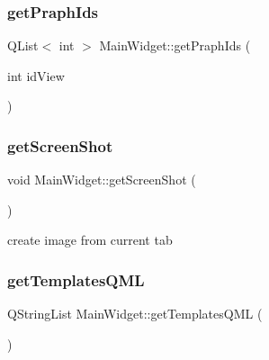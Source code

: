 \hypertarget{class_main_widget_ab020265c95f21766b1aa1f8c426e7f34}{}\label{class_main_widget_ab020265c95f21766b1aa1f8c426e7f34} 
\subsubsection{\texorpdfstring{get\+Praph\+Ids}{getPraphIds}}
{\footnotesize\ttfamily Q\+List$<$ int $>$ Main\+Widget\+::get\+Praph\+Ids (\begin{DoxyParamCaption}\item[{int}]{id\+View }\end{DoxyParamCaption})\hspace{0.3cm}{\ttfamily [slot]}}

\hypertarget{class_main_widget_ad7b4fcd48d785d3b6d71160971e205a1}{}\label{class_main_widget_ad7b4fcd48d785d3b6d71160971e205a1} 
\subsubsection{\texorpdfstring{get\+Screen\+Shot}{getScreenShot}}
{\footnotesize\ttfamily void Main\+Widget\+::get\+Screen\+Shot (\begin{DoxyParamCaption}{ }\end{DoxyParamCaption})\hspace{0.3cm}{\ttfamily [slot]}}



create image from current tab 

\hypertarget{class_main_widget_ae77e3f796aea1d773586b1ef381061c1}{}\label{class_main_widget_ae77e3f796aea1d773586b1ef381061c1} 
\subsubsection{\texorpdfstring{get\+Templates\+Q\+ML}{getTemplatesQML}}
{\footnotesize\ttfamily Q\+String\+List Main\+Widget\+::get\+Templates\+Q\+ML (\begin{DoxyParamCaption}{ }\end{DoxyParamCaption})\hspace{0.3cm}{\ttfamily [slot]}}

